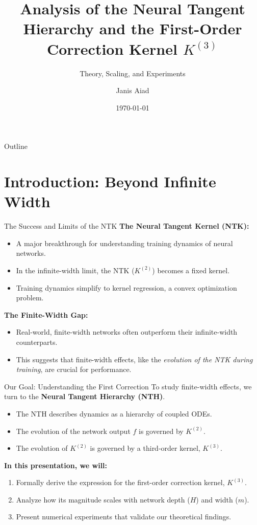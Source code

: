 \documentclass{beamer}
\title{Analysis of the Neural Tangent Hierarchy and the First-Order Correction Kernel $K^{(3)}$}
\subtitle{Theory, Scaling, and Experiments}
\author{Janis Aiad}
\institute{UMD, Ecole Polytechnique}
\date{\today}
\begin{document}
\begin{frame}
\titlepage
\end{frame}

\begin{frame}{Outline}
\tableofcontents
\end{frame}

\section{Introduction: Beyond Infinite Width}

\begin{frame}{The Success and Limits of the NTK}
\textbf{The Neural Tangent Kernel (NTK):}
\begin{itemize}
    \item A major breakthrough for understanding training dynamics of neural networks.
    \item In the infinite-width limit, the NTK ($K^{(2)}$) becomes a fixed kernel.
    \item Training dynamics simplify to kernel regression, a convex optimization problem.
\end{itemize}
\vspace{1cm}
\textbf{The Finite-Width Gap:}
\begin{itemize}
    \item Real-world, finite-width networks often outperform their infinite-width counterparts.
    \item This suggests that finite-width effects, like the \textit{evolution of the NTK during training}, are crucial for performance.
\end{itemize}
\end{frame}

\begin{frame}{Our Goal: Understanding the First Correction}
To study finite-width effects, we turn to the \textbf{Neural Tangent Hierarchy (NTH)}.
\begin{itemize}
    \item The NTH describes dynamics as a hierarchy of coupled ODEs.
    \item The evolution of the network output $f$ is governed by $K^{(2)}$.
    \item The evolution of $K^{(2)}$ is governed by a third-order kernel, $K^{(3)}$.
\end{itemize}
\vspace{1cm}
\textbf{In this presentation, we will:}
\begin{enumerate}
    \item Formally derive the expression for the first-order correction kernel, $K^{(3)}$.
    \item Analyze how its magnitude scales with network depth ($H$) and width ($m$).
    \item Present numerical experiments that validate our theoretical findings.
\end{enumerate}
\end{frame}
\end{document}
